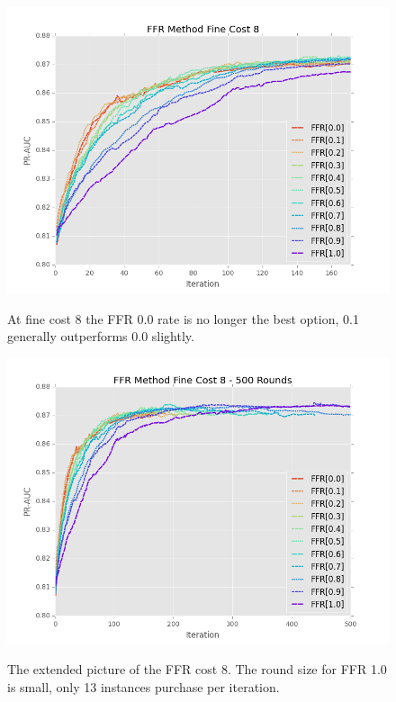 \documentclass[ms]{nuthesis}
\begin{document}
\FloatBarrier
\begin{figure}[!htb]
	\centering
    \includegraphics[width=1.0\columnwidth]{fig/FFR_PR_Cost8_rnds0_171}
    \label{fig:FFR_PR_Cost8_rnds0_171}
    \caption{At fine cost 8 the FFR 0.0 rate is no longer the best option, 0.1
    generally outperforms 0.0 slightly.}
\end{figure}
\FloatBarrier


\FloatBarrier
\begin{figure}[!htb]
	\centering
    \includegraphics[width=1.0\columnwidth]{fig/FFR_PR_Cost8_rnds0_500}
    \label{fig:FFR_PR_Cost8_rnds0_500}
    \caption{The extended picture of the FFR cost 8. The round size for FFR 1.0
    is small, only 13 instances purchase per iteration.}
\end{figure}
\FloatBarrier
\end{document}
